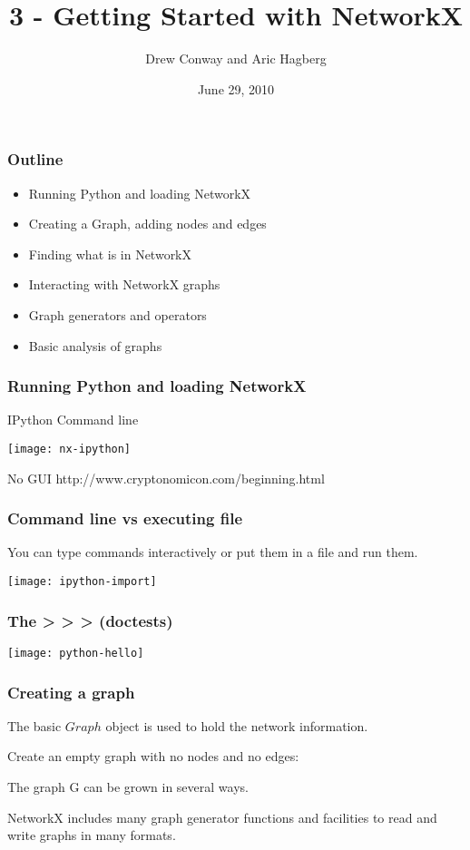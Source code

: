 \documentclass[xcolor=dvipsnames, 9pt]{beamer}
\title{3 - Getting Started with NetworkX}
\author{Drew Conway and Aric Hagberg}
\date{June 29, 2010}
\begin{document}
\begin{frame}[plain]
\titlepage
\end{frame}

\begin{frame}
\frametitle{Outline}
\begin{itemize}
\item Running Python and loading NetworkX
\item Creating a Graph, adding nodes and edges
\item Finding what is in NetworkX
\item Interacting with NetworkX graphs
\item Graph generators and operators
\item Basic analysis of graphs
\end{itemize}
\end{frame}

\begin{frame}
\frametitle{Running Python and loading NetworkX}
IPython Command line 
\centerline{\texttt{[image: nx-ipython]}}
No GUI \footnotesize{http://www.cryptonomicon.com/beginning.html}
\end{frame}

\begin{frame}
\frametitle{Command line vs executing file}
You can type commands interactively or put them in a file and run them.
\centerline{\texttt{[image: ipython-import]}}
\end{frame}

\begin{frame}
\frametitle{The > > > (doctests)}
\centerline{\texttt{[image: python-hello]}}
\end{frame}

\begin{frame}
\frametitle{Creating a graph}

The basic $Graph$ object is used to hold the network information.

Create an empty graph with no nodes and no edges:

\begin{block}{}

\end{block}

The graph G can be grown in several ways.

NetworkX includes many graph generator functions 
and facilities to read and write graphs in many formats.
\end{frame}
\end{document}
